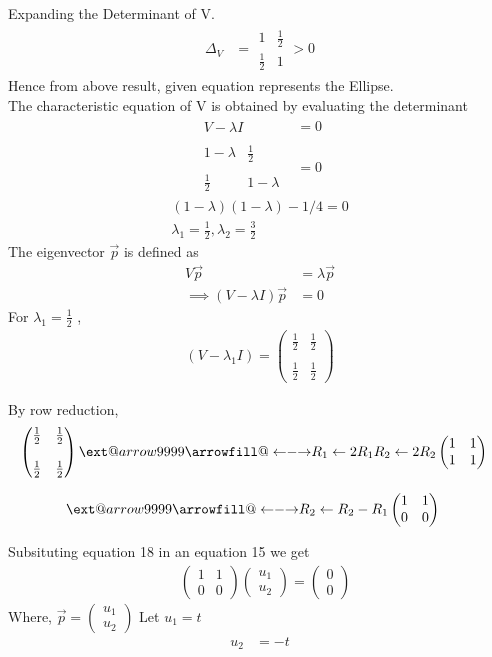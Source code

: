 \documentclass[journal,12pt,twocolumn]{IEEEtran}
\makeatletter
\newcommand\xleftrightarrow[2][]{%
  \ext@arrow 9999{\longleftrightarrowfill@}{#1}{#2}}
\newcommand\longleftrightarrowfill@{%
  \arrowfill@\leftarrow\relbar\rightarrow}
\newcommand{\myvec}[1]{\ensuremath{\begin{pmatrix}#1\end{pmatrix}}}
\makeatother
\begin{document}
Expanding the Determinant of V.
\begin{align}
    \Delta_{V} &= \begin{array}{|cc|}
1 &\frac{1}{2}\\\frac{1}{2} & 1
\end{array}>0
\end{align}
Hence from above result, given equation represents the Ellipse.\\
The characteristic equation of V is obtained by evaluating the determinant 
\begin{align}
\begin{array}{|c|}
V-\lambda I
\end{array}&=0\\
\begin{array}{|cc|}
1-\lambda & \frac{1}{2} \\\\ \frac{1}{2} & 1-\lambda
\end{array}&=0
\end{align}
\begin{align}
(1-\lambda)(1-\lambda)-1/4=0\\
\lambda_{1}=\frac{1}{2},   \lambda_{2}=\frac{3}{2}
\end{align}
The eigenvector $\vec{p}$ is defined as 
\begin{align}
    V\vec{p}&=\lambda\vec{p}\\
    \implies (V-\lambda I)\vec{p}&=0
\end{align}
For $\lambda_1=\frac{1}{2}$ ,
\begin{align}
    (V-\lambda_1I)=\myvec{\frac{1}{2} & \frac{1}{2} \\\\\frac{1}{2} & \frac{1}{2}}
\end{align}

 By row reduction,
\begin{align}
&\myvec{\frac{1}{2} & \frac{1}{2}\\ \\ \frac{1}{2} & \frac{1}{2}}
\xleftrightarrow[R_1\leftarrow 2R_1]{R_2\leftarrow 2R_2}
\myvec{1 & 1 \\ 1 & 1}
\end{align}

\begin{align}
&\xleftrightarrow{R_2\leftarrow R_2 - R_1}
\myvec{1 & 1 \\ 0 & 0 }
\end{align}

Subsituting equation 18 in an equation 15 we get
\begin{align}
        &   \myvec{1 & 1 \\ 0& 0}\myvec{u_1 \\ u_2}=\myvec{0 \\ 0}
\end{align}
Where, $\vec{p}=\myvec{u_1\\u_2}$
Let $u_1=t$
\begin{align}
    u_2&=-t
\end{align}
\end{document}
